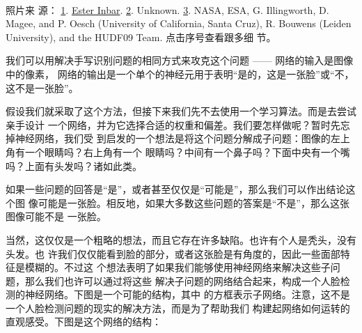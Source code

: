 \begin{center}
\begin{minipage}{0.4\textwidth}
\end{minipage}
\\
\begin{minipage}{0.9\textwidth}
  \footnotesize 照片来
  源：
  \href{http://commons.wikimedia.org/wiki/File:Kangaroo_ST_03.JPG}{1}. \href{http://commons.wikimedia.org/wiki/User:ST}{Ester
    Inbar}. \href{http://commons.wikimedia.org/wiki/File:Albert_Einstein_at_the_age_of_three_(1882).jpg}{2}. Unknown. \href{http://commons.wikimedia.org/wiki/File:The_Hubble_eXtreme_Deep_Field.jpg}{3}. NASA,
  ESA, G. Illingworth, D. Magee, and P. Oesch (University of California, Santa
  Cruz), R. Bouwens (Leiden University), and the HUDF09 Team. 点击序号查看跟多细
  节。
\end{minipage}
\end{center}

我们可以用解决手写识别问题的相同方式来攻克这个问题 —— 网络的输入是图像中的像素，
网络的输出是一个单个的神经元用于表明``是的，这是一张脸''或``不，这不是一张脸''。

假设我们就采取了这个方法，但接下来我们先不去使用一个学习算法。而是去尝试亲手设计
一个网络，并为它选择合适的权重和偏差。我们要怎样做呢？暂时先忘掉神经网络，我们受
到启发的一个想法是将这个问题分解成子问题：图像的左上角有一个眼睛吗？右上角有一个
眼睛吗？中间有一个鼻子吗？下面中央有一个嘴吗？上面有头发吗？诸如此类。

如果一些问题的回答是``是''，或者甚至仅仅是``可能是''，那么我们可以作出结论这个图
像可能是一张脸。相反地，如果大多数这些问题的答案是``不是''，那么这张图像可能不是
一张脸。

当然，这仅仅是一个粗略的想法，而且它存在许多缺陷。也许有个人是秃头，没有头发。也
许我们仅仅能看到脸的部分，或者这张脸是有角度的，因此一些面部特征是模糊的。不过这
个想法表明了如果我们能够使用神经网络来解决这些子问题，那么我们也许可以通过将这些
解决子问题的网络结合起来，构成一个人脸检测的神经网络。下图是一个可能的结构，其中
的方框表示子网络。注意，这不是一个人脸检测问题的现实的解决方法，而是为了帮助我们
构建起网络如何运转的直观感受。下图是这个网络的结构：

